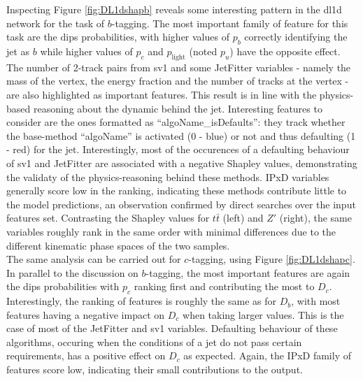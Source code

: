 Inspecting Figure \ref{fig:DL1dshapb} reveals some interesting pattern in the \gls{dl1d} network for the task of $b$-tagging. The most important family of feature for this task are the \gls{dips} probabilities, with higher values of $p_b$ correctly identifying the jet as $b$ while higher values of $p_c$ and $p_{\textrm{light}}$ (noted $p_u$) have the opposite effect. The number of 2-track pairs from \gls{sv1} and some JetFitter variables - namely the mass of the vertex, the energy fraction and the number of tracks at the vertex - are also highlighted as important features. This result is in line with the physics-based reasoning about the dynamic behind the jet. Interesting features to consider are the ones formatted as  ``algoName\_isDefaults'': they track whether the base-method ``algoName'' is activated (0 - blue) or not and thus defaulting (1 - red) for the jet. Interestingly, most of the occurences of a defaulting behaviour of \gls{sv1} and JetFitter are associated with a negative Shapley values, demonstrating the validaty of the physics-reasoning behind these methods. IPxD variables generally score low in the ranking, indicating these methods contribute little to the model predictions, an observation confirmed by direct searches over the input features set. Contrasting the Shapley values for $t\bar{t}$ (left) and $Z'$ (right), the same variables roughly rank in the same order with minimal differences due to the different kinematic phase spaces of the two samples. \\

The same analysis can be carried out for $c$-tagging, using Figure \ref{fig:DL1dshapc}. In parallel to the discussion on $b$-tagging, the most important features are again the \gls{dips} probabilities with $p_c$ ranking first and contributing the most to $D_c$. Interestingly, the ranking of features is roughly the same as for $D_b$, with most features having a negative impact on $D_c$ when taking larger values. This is the case of most of the JetFitter and \gls{sv1} variables. Defaulting behaviour of these algorithms, occuring when the conditions of a jet do not pass certain requirements, has a positive effect on $D_c$ as expected. Again, the IPxD family of features score low, indicating their small contributions to the output. 

\clearpage


